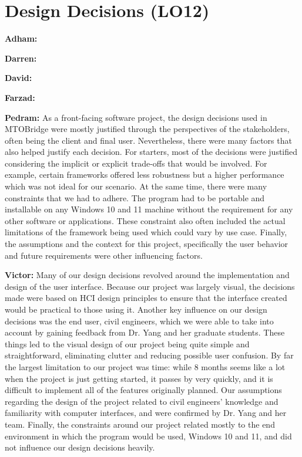 \documentclass{article}
\begin{document}
\section{Design Decisions (LO12)}


\textbf{Adham:}

\textbf{Darren:}

\textbf{David:}

\textbf{Farzad:}

\textbf{Pedram:} As a front-facing software project, the design decisions used in MTOBridge were mostly justified through the perspectives of the stakeholders, often being the client and final user. Nevertheless, there were many factors that also helped justify each decision. For starters, most of the decisions were justified considering the implicit or explicit trade-offs that would be involved. For example, certain frameworks offered less robustness but a higher performance which was not ideal for our scenario. At the same time, there were many constraints that we had to adhere. The program had to be portable and installable on any Windows 10 and 11 machine without the requirement for any other software or applications. These constraint also often included the actual limitations of the framework being used which could vary by use case. Finally, the assumptions and the context for this project, specifically the user behavior and future requirements were other influencing factors. 

\textbf{Victor:} Many of our design decisions revolved around the implementation and design of the user interface. Because our project was largely visual, the decisions made were based on HCI design principles to ensure that the interface created would be practical to those using it. Another key influence on our design decisions was the end user, civil engineers, which we were able to take into account by gaining feedback from Dr. Yang and her graduate students. These things led to the visual design of our project being quite simple and straightforward, eliminating clutter and reducing possible user confusion. By far the largest limitation to our project was time: while 8 months seems like a lot when the project is just getting started, it passes by very quickly, and it is difficult to implement all of the features originally planned. Our assumptions regarding the design of the project related to civil engineers' knowledge and familiarity with computer interfaces, and were confirmed by Dr. Yang and her team. Finally, the constraints around our project related mostly to the end environment in which the program would be used, Windows 10 and 11, and did not influence our design decisions heavily. 
\end{document}
